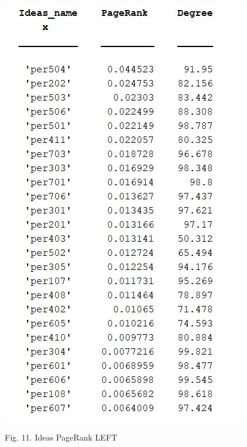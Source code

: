 \documentclass{article}%
\begin{document}
\begin{center}
\includegraphics[scale=0.5]{PageRank_ideas_left}

\begin{small}
Fig. 11. Ideas PageRank LEFT
\end{small}
\end{center}
\end{document}
